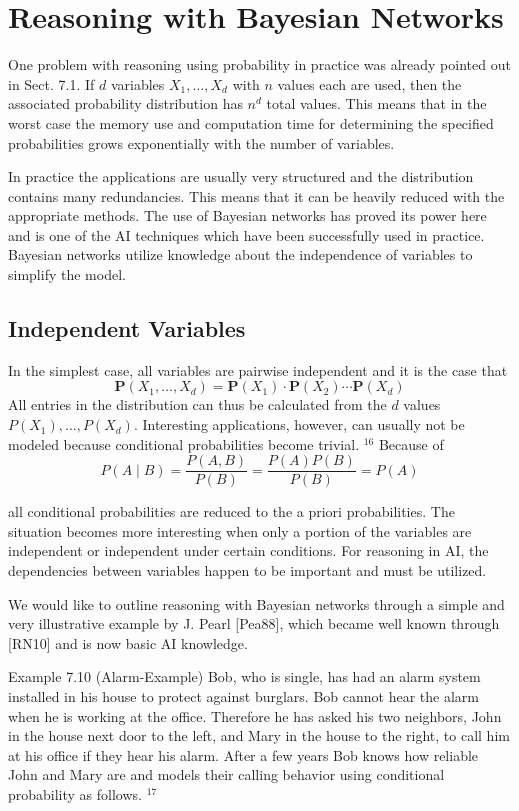 \documentclass[10pt]{book}
\begin{document}
\section{Reasoning with Bayesian Networks}
One problem with reasoning using probability in practice was already pointed out in Sect. 7.1. If $d$ variables $X_{1}, \ldots, X_{d}$ with $n$ values each are used, then the associated probability distribution has $n^{d}$ total values. This means that in the worst case the memory use and computation time for determining the specified probabilities grows exponentially with the number of variables.

In practice the applications are usually very structured and the distribution contains many redundancies. This means that it can be heavily reduced with the appropriate methods. The use of Bayesian networks has proved its power here and is one of the AI techniques which have been successfully used in practice. Bayesian networks utilize knowledge about the independence of variables to simplify the model.

\subsection{Independent Variables}
In the simplest case, all variables are pairwise independent and it is the case that
$$
\boldsymbol{P}\left(X_{1}, \ldots, X_{d}\right)=\boldsymbol{P}\left(X_{1}\right) \cdot \boldsymbol{P}\left(X_{2}\right) \cdots \boldsymbol{P}\left(X_{d}\right)
$$
All entries in the distribution can thus be calculated from the $d$ values $P\left(X_{1}\right), \ldots, P\left(X_{d}\right)$. Interesting applications, however, can usually not be modeled because conditional probabilities become trivial. ${ }^{16}$ Because of
$$
P(A \mid B)=\frac{P(A, B)}{P(B)}=\frac{P(A) P(B)}{P(B)}=P(A)
$$

all conditional probabilities are reduced to the a priori probabilities. The situation becomes more interesting when only a portion of the variables are independent or independent under certain conditions. For reasoning in AI, the dependencies between variables happen to be important and must be utilized.

We would like to outline reasoning with Bayesian networks through a simple and very illustrative example by J. Pearl [Pea88], which became well known through [RN10] and is now basic AI knowledge.

Example 7.10 (Alarm-Example) Bob, who is single, has had an alarm system installed in his house to protect against burglars. Bob cannot hear the alarm when he is working at the office. Therefore he has asked his two neighbors, John in the house next door to the left, and Mary in the house to the right, to call him at his office if they hear his alarm. After a few years Bob knows how reliable John and Mary are and models their calling behavior using conditional probability as follows. ${ }^{17}$
\end{document}
